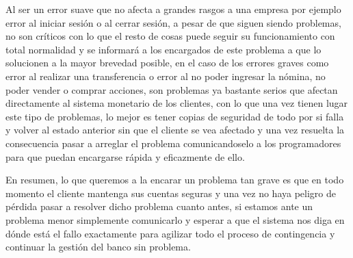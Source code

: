 Al ser un error suave que no afecta a grandes rasgos a una empresa por ejemplo error al iniciar sesión o al cerrar sesión, a pesar de que siguen siendo problemas, no son críticos con lo que el resto de cosas puede seguir su funcionamiento con total normalidad y se informará a los encargados de este problema a que lo solucionen a la mayor brevedad posible, en el caso de los errores graves como error al realizar una transferencia o error al no poder ingresar la nómina, no poder vender o comprar acciones, son problemas ya bastante serios que afectan directamente al sistema monetario de los clientes, con lo que una vez tienen lugar este tipo de problemas, lo mejor es tener copias de seguridad de todo por si falla y volver al estado anterior sin que el cliente se vea afectado y una vez resuelta la consecuencia pasar a arreglar el problema comunicandoselo a los programadores para que puedan encargarse rápida y eficazmente de ello.

En resumen, lo que queremos a la encarar un problema tan grave es que en todo momento el cliente mantenga sus cuentas seguras y una vez no haya peligro de pérdida pasar a resolver dicho problema cuanto antes, si estamos ante un problema menor simplemente comunicarlo y esperar a que el sistema nos diga en dónde está el fallo exactamente para agilizar todo el proceso de contingencia y continuar la gestión del banco sin problema.
